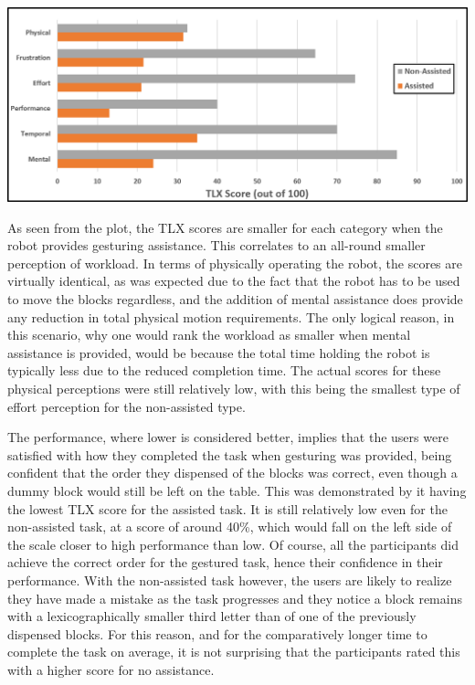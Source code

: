 \documentclass[11pt]{article}
\begin{document}
\begin{center}
\includegraphics[width=\textwidth]{images/tlxResults.png}
\label{figure:tlxResults}
\end{center}

As seen from the plot, the TLX scores are smaller for each category when the robot provides gesturing assistance. This correlates to an all-round smaller perception of workload. In terms of physically operating the robot, the scores are virtually identical, as was expected due to the fact that the robot has to be used to move the blocks regardless, and the addition of mental assistance does provide any reduction in total physical motion requirements. The only logical reason, in this scenario, why one would rank the workload as smaller when mental assistance is provided, would be because the total time holding the robot is typically less due to the reduced completion time. The actual scores for these physical perceptions were still relatively low, with this being the smallest type of effort perception for the non-assisted type. 

The performance, where lower is considered better, implies that the users were satisfied with how they completed the task when gesturing was provided, being confident that the order they dispensed of the blocks was correct, even though a dummy block would still be left on the table. This was demonstrated by it having the lowest TLX score for the assisted task. It is still relatively low even for the non-assisted task, at a score of around 40\%, which would fall on the left side of the scale closer to high performance than low. Of course, all the participants did achieve the correct order for the gestured task, hence their confidence in their performance. With the non-assisted task however, the users are likely to realize they have made a mistake as the task progresses and they notice a block remains with a lexicographically smaller third letter than of one of the previously dispensed blocks. For this reason, and for the comparatively longer time to complete the task on average, it is not surprising that the participants rated this with a higher score for no assistance. 
\end{document}
